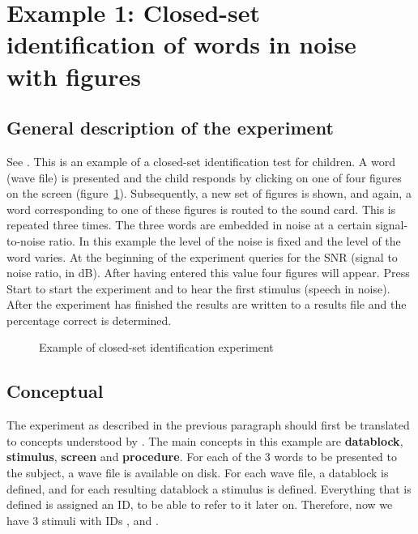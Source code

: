 \newpage
\section{Example 1: Closed-set identification of words in noise with
figures}

\subsection{General description of the experiment} See
. This is an example
of a closed-set identification test for children. A word (wave
file) is presented and the child responds by clicking on one of
four figures on the screen (figure~\ref{fig:closedset}).
Subsequently, a new set of figures is shown, and again, a word
corresponding to one of these figures is routed to the sound card.
This is repeated three times. The three words are embedded in noise at
a certain signal-to-noise ratio. In this example the level of the
noise is fixed and the level of the word varies. At the beginning
of the experiment \apex queries for the SNR (signal to noise
ratio, in dB). After having entered this value four figures will
appear. Press Start to start the experiment and to hear the first
stimulus (speech in noise). After the experiment has finished the
results are written to a results file and the percentage correct
is determined.


\begin{figure}
 \centering
 \caption{Example of closed-set identification experiment}
 \label{fig:closedset}
\end{figure}

\subsection{Conceptual}
The experiment as described in the previous paragraph should first
be translated to concepts understood by \apex. The main concepts
in this example are \textbf{datablock}, \textbf{stimulus},
\textbf{screen} and \textbf{procedure}. For each of the 3 words to
be presented to the subject, a wave file is available on disk. For
each wave file, a datablock is defined, and for each resulting
datablock a stimulus is defined. Everything that is defined is
assigned an ID, to be able to refer to it later on. Therefore, now
we have 3 stimuli with IDs , 
and .

